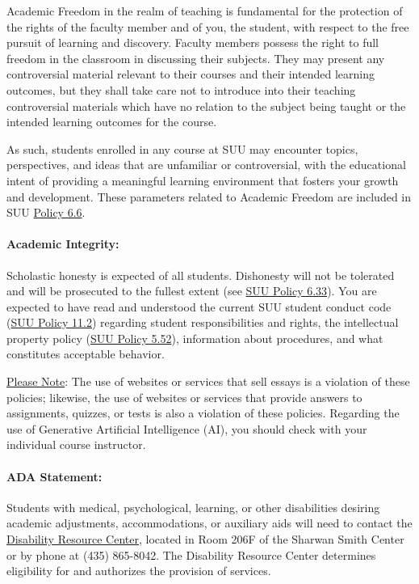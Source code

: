\documentclass[12pt, letterpaper]{article}
\begin{document}
\noindent
Academic Freedom in the realm of teaching is fundamental for the protection of the rights of the faculty member and of you, the student, with respect to the free pursuit of learning and discovery. Faculty members possess the right to full freedom in the classroom in discussing their subjects. They may present any controversial material relevant to their courses and their intended learning outcomes, but they shall take care not to introduce into their teaching controversial materials which have no relation to the subject being taught or the intended learning outcomes for the course.

\noindent
As such, students enrolled in any course at SUU may encounter topics, perspectives, and ideas that are unfamiliar or controversial, with the educational intent of providing a meaningful learning environment that fosters your growth and development. These parameters related to Academic Freedom are included in SUU \href{https://www.suu.edu/policies/06/06.html}{Policy 6.6}.

\paragraph{Academic Integrity:}
Scholastic honesty is expected of all students. Dishonesty will not be tolerated and will be prosecuted to the fullest extent (see \href{https://www.suu.edu/policies/06/33.html}{SUU Policy 6.33}). You are expected to have read and understood the current SUU student conduct code (\href{https://www.suu.edu/policies/11/02.html}{SUU Policy 11.2}) regarding student responsibilities and rights, the intellectual property policy (\href{https://www.suu.edu/policies/05/52.html}{SUU Policy 5.52}), information about procedures, and what constitutes acceptable behavior. 

\noindent
\underline{Please Note}: The use of websites or services that sell essays is a violation of these policies; likewise, the use of websites or services that provide answers to assignments, quizzes, or tests is also a violation of these policies. Regarding the use of Generative Artificial Intelligence (AI), you should check with your individual course instructor.

\paragraph{ADA Statement:}
Students with medical, psychological, learning, or other disabilities desiring academic adjustments, accommodations, or auxiliary aids will need to contact the \href{https://www.suu.edu/disabilityservices/}{Disability Resource Center}, located in Room 206F of the Sharwan Smith Center or by phone at (435) 865-8042. The Disability Resource Center determines eligibility for and authorizes the provision of services.
\end{document}
